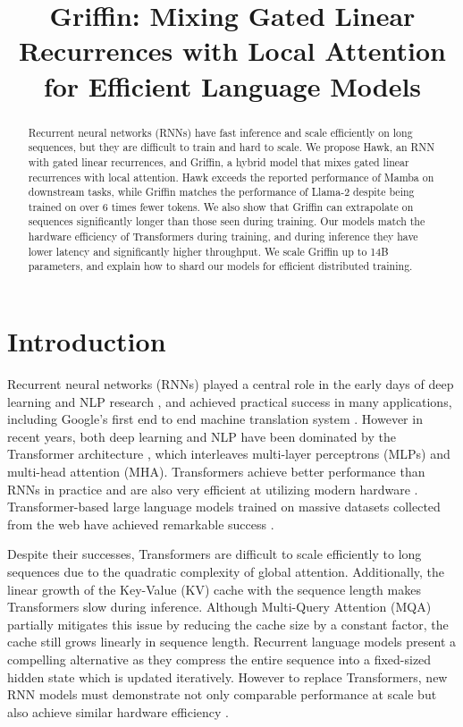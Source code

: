 \title{Griffin: Mixing Gated Linear Recurrences with Local Attention for Efficient Language Models}

\begin{abstract}
Recurrent neural networks (RNNs) have fast inference and scale efficiently on long sequences, but they are difficult to train and hard to scale. We propose Hawk, an RNN with gated linear recurrences, and Griffin, a hybrid model that mixes gated linear recurrences with local attention. Hawk exceeds the reported performance of Mamba on downstream tasks, while Griffin matches the performance of Llama-2 despite being trained on over 6 times fewer tokens. We also show that Griffin can extrapolate on sequences significantly longer than those seen during training. Our models match the hardware efficiency of Transformers during training, and during inference they have lower latency and significantly higher throughput. We scale Griffin up to 14B parameters, and explain how to shard our models for efficient distributed training.
\end{abstract}

\section{Introduction}

Recurrent neural networks (RNNs) played a central role in the early days of deep learning and NLP research \citep{elman1990finding, Siegelmann1991, hochreiter1997long, Mikolov2010, bahdanau2014neural, sutskever2014sequence}, and achieved practical success in many applications, including Google's first end to end machine translation system \citep{wu2016google}. However in recent years, both deep learning and NLP have been dominated by the Transformer architecture \citep{vaswani2017attention}, which interleaves multi-layer perceptrons (MLPs) and multi-head attention (MHA). Transformers achieve better performance than RNNs in practice and are also very efficient at utilizing modern hardware  \citep{kaplan2020scaling}. Transformer-based large language models trained on massive datasets collected from the web have achieved remarkable success \citep{brown2020language,rae2021scaling,  hoffmann2022training, touvron2023llama, achiam2023gpt, team2023gemini}.

Despite their successes, Transformers are difficult to scale efficiently to long sequences due to the quadratic complexity of global attention. Additionally, the linear growth of the Key-Value (KV) cache with the sequence length makes Transformers slow during inference. Although Multi-Query Attention (MQA) \citep{shazeer2019fast} partially mitigates this issue by reducing the cache size by a constant factor, the cache still grows linearly in sequence length. Recurrent language models present a compelling alternative as they compress the entire sequence into a fixed-sized hidden state which is updated iteratively. However to replace Transformers, new RNN models must demonstrate not only comparable performance at scale but also achieve similar hardware efficiency \citep{gu2021efficiently,mehta2022long, smith2022simplified, orvieto2023resurrecting, dao2022hungry, poli2023hyena, gu2023mamba}.

